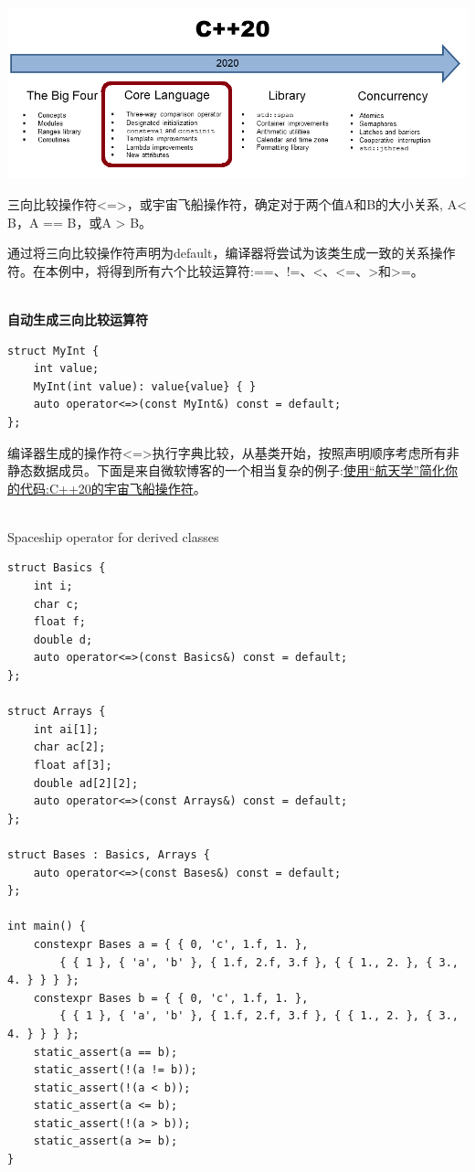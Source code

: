 

\begin{center}
\includegraphics[width=1.0\textwidth]{content/2/chapter3/images/4.png}\\
\end{center}


三向比较操作符<=>，或宇宙飞船操作符，确定对于两个值A和B的大小关系, A< B，A == B，或A > B。

通过将三向比较操作符声明为default，编译器将尝试为该类生成一致的关系操作符。在本例中，将得到所有六个比较运算符:==、!=、<、<=、>和>=。

\hspace*{\fill} \\ %
\noindent
\textbf{自动生成三向比较运算符}
\begin{lstlisting}[style=styleCXX]
struct MyInt {
	int value;
	MyInt(int value): value{value} { }
	auto operator<=>(const MyInt&) const = default;
};
\end{lstlisting}

编译器生成的操作符<=>执行字典比较，从基类开始，按照声明顺序考虑所有非静态数据成员。下面是来自微软博客的一个相当复杂的例子:\href{https://devblogs.microsoft.com/cppblog/simplify-your-code-with-rocket-science-c20s-spaceship-operator/}{使用“航天学”简化你的代码:C++20的宇宙飞船操作符}。


\hspace*{\fill} \\ %
\noindent
Spaceship operator for derived classes
\begin{lstlisting}[style=styleCXX]
struct Basics {
	int i;
	char c;
	float f;
	double d;
	auto operator<=>(const Basics&) const = default;
};

struct Arrays {
	int ai[1];
	char ac[2];
	float af[3];
	double ad[2][2];
	auto operator<=>(const Arrays&) const = default;
};

struct Bases : Basics, Arrays {
	auto operator<=>(const Bases&) const = default;
};

int main() {
	constexpr Bases a = { { 0, 'c', 1.f, 1. },
		{ { 1 }, { 'a', 'b' }, { 1.f, 2.f, 3.f }, { { 1., 2. }, { 3., 4. } } } };
	constexpr Bases b = { { 0, 'c', 1.f, 1. },
		{ { 1 }, { 'a', 'b' }, { 1.f, 2.f, 3.f }, { { 1., 2. }, { 3., 4. } } } };
	static_assert(a == b);
	static_assert(!(a != b));
	static_assert(!(a < b));
	static_assert(a <= b);
	static_assert(!(a > b));
	static_assert(a >= b);
}
\end{lstlisting}

